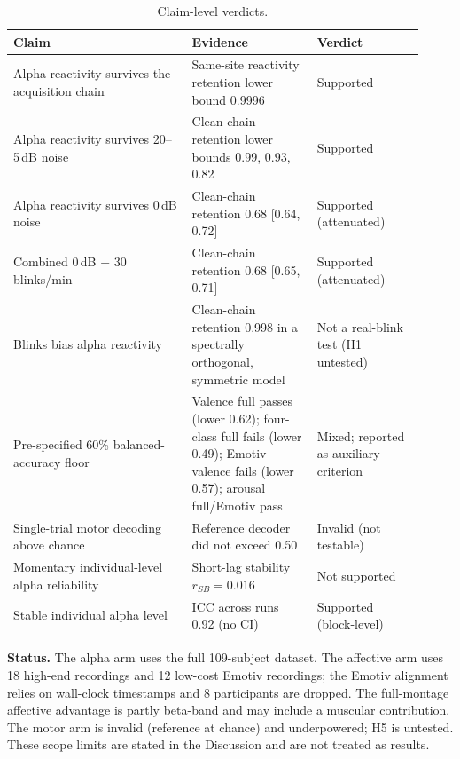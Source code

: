 \begin{table}[H]
  \centering
  \caption{Claim-level verdicts.}
  \label{tab:decision}
  \begin{tabular}{p{0.40\linewidth}p{0.28\linewidth}p{0.24\linewidth}}
    \hline
    Claim & Evidence & Verdict \\
    \hline
    Alpha reactivity survives the acquisition chain & Same-site reactivity retention lower bound 0.9996 & Supported \\
    Alpha reactivity survives 20--5\,dB noise & Clean-chain retention lower bounds 0.99, 0.93, 0.82 & Supported \\
    Alpha reactivity survives 0\,dB noise & Clean-chain retention 0.68 [0.64, 0.72] & Supported (attenuated) \\
    Combined 0\,dB + 30 blinks/min & Clean-chain retention 0.68 [0.65, 0.71] & Supported (attenuated) \\
    Blinks bias alpha reactivity & Clean-chain retention 0.998 in a spectrally orthogonal, symmetric model & Not a real-blink test (H1 untested) \\
    Pre-specified 60\% balanced-accuracy floor & Valence full passes (lower 0.62); four-class full fails (lower 0.49); Emotiv valence fails (lower 0.57); arousal full/Emotiv pass & Mixed; reported as auxiliary criterion \\
    Single-trial motor decoding above chance & Reference decoder did not exceed 0.50 & Invalid (not testable) \\
    Momentary individual-level alpha reliability & Short-lag stability $r_{SB}=0.016$ & Not supported \\
    Stable individual alpha level & ICC across runs 0.92 (no CI) & Supported (block-level) \\
    \hline
  \end{tabular}
\end{table}

\noindent
\textbf{Status.} The alpha arm uses the full 109-subject dataset. The
affective arm uses 18 high-end recordings and 12 low-cost Emotiv recordings; the Emotiv
alignment relies on wall-clock timestamps and 8 participants are dropped. The
full-montage affective advantage is partly beta-band and may include a muscular
contribution. The motor arm is invalid (reference at chance) and underpowered; H5 is untested. These scope limits are
stated in the Discussion and are not treated as results.
